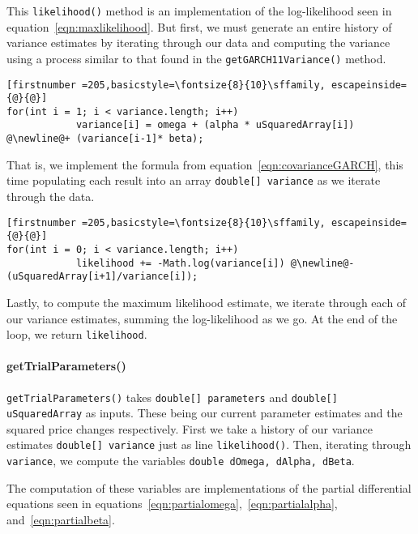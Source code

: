 \documentclass[../Dissertation.tex]{subfiles}
\begin{document}
This \lstinline|likelihood()| method is an implementation of the log-likelihood seen in equation~\ref{eqn:maxlikelihood}.
But first, we must generate an entire history of variance estimates by iterating through our data and computing the variance using a process similar to that found in the \lstinline|getGARCH11Variance()| method.
\begin{lstlisting}[firstnumber =205,basicstyle=\fontsize{8}{10}\sffamily, escapeinside={@}{@}]
for(int i = 1; i < variance.length; i++)
            variance[i] = omega + (alpha * uSquaredArray[i]) @\newline@+ (variance[i-1]* beta);
\end{lstlisting}
That is, we implement the formula from equation~\ref{eqn:covarianceGARCH}, this time populating each result into an array \lstinline|double[] variance| as we iterate through the data.
\begin{lstlisting}[firstnumber =205,basicstyle=\fontsize{8}{10}\sffamily, escapeinside={@}{@}]
for(int i = 0; i < variance.length; i++)
            likelihood += -Math.log(variance[i]) @\newline@- (uSquaredArray[i+1]/variance[i]);
\end{lstlisting}
Lastly, to compute the maximum likelihood estimate, we iterate through each of our variance estimates, summing the log-likelihood as we go.
At the end of the loop, we return \lstinline|likelihood|.

\paragraph{getTrialParameters()}

\lstinline|getTrialParameters()| takes \lstinline|double[] parameters| and \lstinline|double[] uSquaredArray| as inputs.
These being our current parameter estimates and the squared price changes respectively.
First we take a history of our variance estimates \lstinline|double[] variance| just as line \lstinline|likelihood()|.
Then, iterating through \lstinline|variance|, we compute the variables \lstinline|double dOmega, dAlpha, dBeta|.
\iffalse
\begin{lstlisting}[firstnumber = 231,basicstyle=\fontsize{8}{10}\sffamily, escapeinside={@}{@}]
	dOmega += ((-1/variance[i]) + (uSquaredArray[i]/Math.pow(variance[i],2)));@\newline@
	dAlpha += (-uSquaredArray[i]/variance[i])@\newline@+ (Math.pow(uSquaredArray[i],2)/Math.pow(variance[i],2));@\newline@
	dBeta 	+= (-variance[i-1]/variance[i])@\newline@+ ((uSquaredArray[i]*variance[i-1])/Math.pow(variance[i],2));
\end{lstlisting}
\fi
The computation of these variables are implementations of the partial differential equations seen in equations~\ref{eqn:partialomega},~\ref{eqn:partialalpha}, and~\ref{eqn:partialbeta}.
\end{document}
